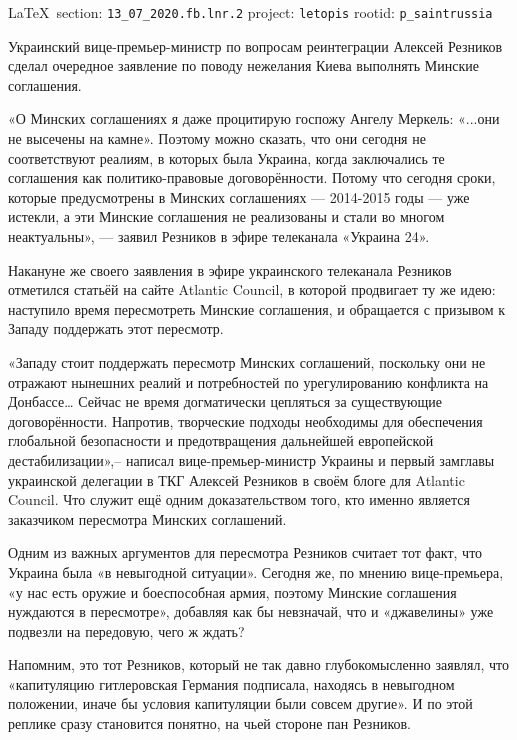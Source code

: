 \documentclass[a4paper,11pt]{extreport}
\begin{document}
\vspace{0.5cm}
{\ifDEBUG\small\LaTeX~section: \verb|13_07_2020.fb.lnr.2| project: \verb|letopis| rootid: \verb|p_saintrussia|\fi}
\vspace{0.5cm}

Украинский вице-премьер-министр по вопросам реинтеграции Алексей Резников
сделал очередное заявление по поводу нежелания Киева выполнять Минские
соглашения.

«О Минских соглашениях я даже процитирую госпожу Ангелу Меркель: «...они не
высечены на камне». Поэтому можно сказать, что они сегодня не соответствуют
реалиям, в которых была Украина, когда заключались те соглашения как
политико-правовые договорённости. Потому что сегодня сроки, которые
предусмотрены в Минских соглашениях --- 2014-2015 годы --- уже истекли, а эти
Минские соглашения не реализованы и стали во многом неактуальны», --- заявил
Резников в эфире телеканала «Украина 24».

Накануне же своего заявления в эфире украинского телеканала Резников отметился
статьёй на сайте Atlantic Council, в которой продвигает ту же идею: наступило
время пересмотреть Минские соглашения, и обращается с призывом к Западу
поддержать этот пересмотр.

«Западу стоит поддержать пересмотр Минских соглашений, поскольку они не
отражают нынешних реалий и потребностей по урегулированию конфликта на
Донбассе… Сейчас не время догматически цепляться за существующие
договорённости. Напротив, творческие подходы необходимы для обеспечения
глобальной безопасности и предотвращения дальнейшей европейской
дестабилизации»,– написал вице-премьер-министр Украины и первый замглавы
украинской делегации в ТКГ Алексей Резников в своём блоге для Atlantic Council.
Что служит ещё одним доказательством того, кто именно является заказчиком
пересмотра Минских соглашений.

Одним из важных аргументов для пересмотра Резников считает тот факт, что
Украина была «в невыгодной ситуации». Сегодня же, по мнению вице-премьера, «у
нас есть оружие и боеспособная армия, поэтому Минские соглашения нуждаются в
пересмотре», добавляя как бы невзначай, что и «джавелины» уже подвезли на
передовую, чего ж ждать?

Напомним, это тот Резников, который не так давно глубокомысленно заявлял, что
«капитуляцию гитлеровская Германия подписала, находясь в невыгодном положении,
иначе бы условия капитуляции были совсем другие». И по этой реплике сразу
становится понятно, на чьей стороне пан Резников.
\end{document}
